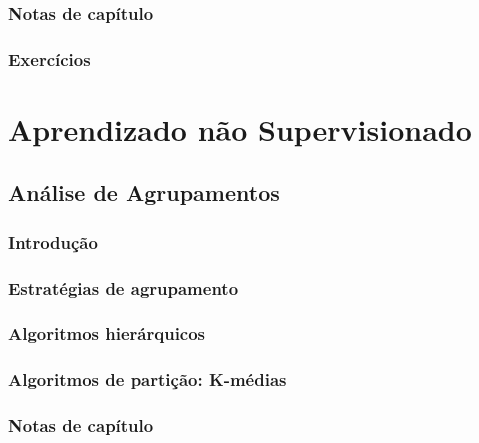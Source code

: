 \documentclass[
]{latex/krantz}
\theoremstyle{definition}
\theoremstyle{definition}
\theoremstyle{definition}
\theoremstyle{definition}
\theoremstyle{remark}
\begin{document}
\hypertarget{notas-de-capuxedtulo-10}{%
\section{Notas de capítulo}\label{notas-de-capuxedtulo-10}}

\hypertarget{exercuxedcios-10}{%
\section{Exercícios}\label{exercuxedcios-10}}

\hypertarget{part-aprendizado-nuxe3o-supervisionado}{%
\part{Aprendizado não Supervisionado}\label{part-aprendizado-nuxe3o-supervisionado}}

\hypertarget{anuxe1lise-de-agrupamentos}{%
\chapter{Análise de Agrupamentos}\label{anuxe1lise-de-agrupamentos}}

\hypertarget{introduuxe7uxe3o-11}{%
\section{Introdução}\label{introduuxe7uxe3o-11}}

\hypertarget{estratuxe9gias-de-agrupamento}{%
\section{Estratégias de agrupamento}\label{estratuxe9gias-de-agrupamento}}

\hypertarget{algoritmos-hieruxe1rquicos}{%
\section{Algoritmos hierárquicos}\label{algoritmos-hieruxe1rquicos}}

\hypertarget{algoritmos-de-partiuxe7uxe3o-k-muxe9dias}{%
\section{Algoritmos de partição: K-médias}\label{algoritmos-de-partiuxe7uxe3o-k-muxe9dias}}

\hypertarget{notas-de-capuxedtulo-11}{%
\section{Notas de capítulo}\label{notas-de-capuxedtulo-11}}
\end{document}
